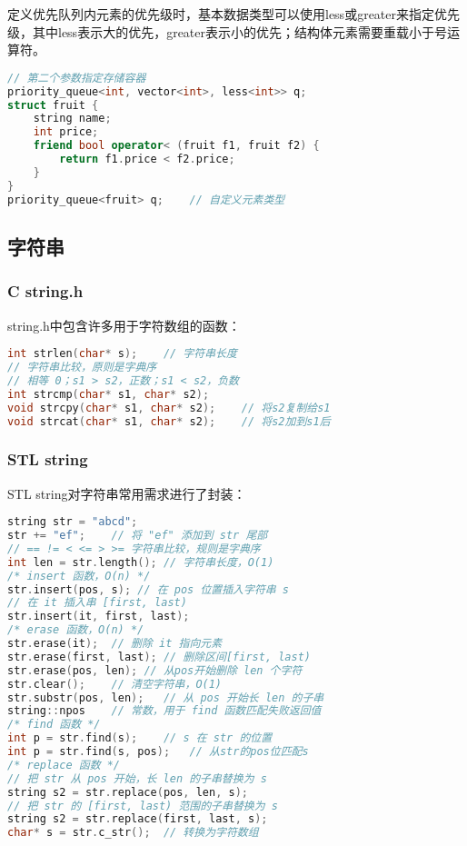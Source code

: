 定义优先队列内元素的优先级时，基本数据类型可以使用less或greater来指定优先级，其中less表示大的优先，greater表示小的优先；结构体元素需要重载小于号运算符。

\begin{lstlisting}[language=c++]
// 第二个参数指定存储容器
priority_queue<int, vector<int>, less<int>> q;
struct fruit {
	string name;
	int price;
	friend bool operator< (fruit f1, fruit f2) {
		return f1.price < f2.price;
	}
}
priority_queue<fruit> q;	// 自定义元素类型
\end{lstlisting}

\subsection{字符串}

\subsubsection{C string.h}

string.h中包含许多用于字符数组的函数：

\begin{lstlisting}[language=c++]
int strlen(char* s);	// 字符串长度
// 字符串比较，原则是字典序
// 相等 0；s1 > s2，正数；s1 < s2，负数
int strcmp(char* s1, char* s2);
void strcpy(char* s1, char* s2);	// 将s2复制给s1
void strcat(char* s1, char* s2);	// 将s2加到s1后
\end{lstlisting}

\subsubsection{STL string}

STL string对字符串常用需求进行了封装：

\begin{lstlisting}[language=c++]
string str = "abcd";
str += "ef";	// 将 "ef" 添加到 str 尾部
// == != < <= > >= 字符串比较，规则是字典序
int len = str.length();	// 字符串长度，O(1)
/* insert 函数，O(n) */
str.insert(pos, s);	// 在 pos 位置插入字符串 s
// 在 it 插入串 [first, last)
str.insert(it, first, last);
/* erase 函数，O(n) */
str.erase(it);	// 删除 it 指向元素
str.erase(first, last);	// 删除区间[first, last)
str.erase(pos, len); // 从pos开始删除 len 个字符
str.clear();	// 清空字符串，O(1)
str.substr(pos, len);	// 从 pos 开始长 len 的子串
string::npos	// 常数，用于 find 函数匹配失败返回值
/* find 函数 */
int p = str.find(s);	// s 在 str 的位置
int p = str.find(s, pos);	// 从str的pos位匹配s
/* replace 函数 */
// 把 str 从 pos 开始，长 len 的子串替换为 s
string s2 = str.replace(pos, len, s);
// 把 str 的 [first, last) 范围的子串替换为 s
string s2 = str.replace(first, last, s);
char* s = str.c_str();	// 转换为字符数组
\end{lstlisting}



